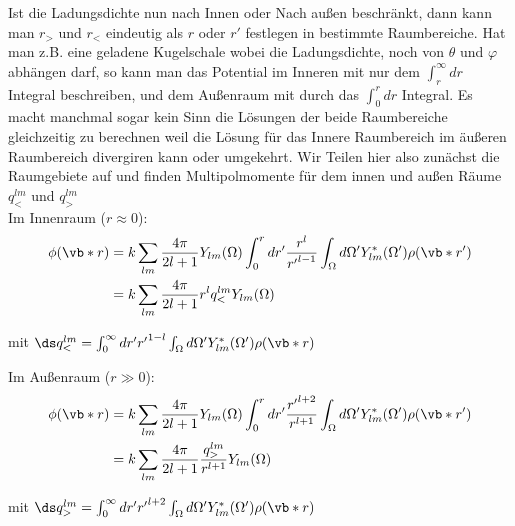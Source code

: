 Ist die Ladungsdichte nun nach Innen oder Nach außen beschränkt, dann kann
man $r_>$ und $r_<$ eindeutig als $r$ oder $r'$ festlegen in bestimmte 
Raumbereiche. Hat man z.B. eine geladene Kugelschale wobei die 
Ladungsdichte, noch von $\theta$ und $\varphi$ abhängen darf, so kann man
das Potential im Inneren mit nur dem $\int_r^\infty dr$ Integral beschreiben, und
dem Außenraum mit durch das $\int_0^r dr$ Integral. Es macht manchmal 
sogar kein Sinn die Lösungen der beide Raumbereiche gleichzeitig zu 
berechnen weil die Lösung für das Innere Raumbereich im äußeren Raumbereich
divergiren kann oder umgekehrt. Wir Teilen hier also zunächst die 
Raumgebiete auf und finden Multipolmomente für dem innen und außen Räume 
$q_<^{lm}$ und $q_>^{lm}$\\

\noindent
Im Innenraum ($r\approx 0$):
\begin{equation}
  \begin{split}
    \phi(\vb*r) 
    &= k\sum_{lm} \frac{4\pi}{2l+1} Y_{lm}(\Omega)
    \int_0^{r} dr'\frac{{r}^{l}}{{r'}^{l-1}}
    \int_\Omega d\Omega'Y^*_{lm}(\Omega')\rho(\vb*r')\\
    &= k\sum_{lm} \frac{4\pi}{2l+1}r^l q_<^{lm} Y_{lm}(\Omega) 
  \end{split}
\end{equation}
\begin{center}
  mit $\ds q_<^{lm}=\int_0^\infty dr' {r'}^{1-l}
  \int_\Omega d\Omega' Y^*_{lm}(\Omega')\rho(\vb*r)$
\end{center}
\noindent
Im Außenraum ($r\gg0$):
\begin{equation}
  \begin{split}
    \phi(\vb*r) 
    &= k\sum_{lm} \frac{4\pi}{2l+1} Y_{lm}(\Omega)
    \int_0^{r} dr'\frac{{r'}^{l+2}}{r^{l+1}}
    \int_\Omega d\Omega'Y^*_{lm}(\Omega')\rho(\vb*r')\\
    &= k\sum_{lm} \frac{4\pi}{2l+1} 
    \frac{q_>^{lm}}{r^{l+1}} Y_{lm}(\Omega) 
  \end{split}
\end{equation}
\begin{center}
  mit $\ds q_>^{lm}=\int_0^\infty dr' {r'}^{l+2}
  \int_\Omega d\Omega' Y^*_{lm}(\Omega')\rho(\vb*r)$
\end{center}

